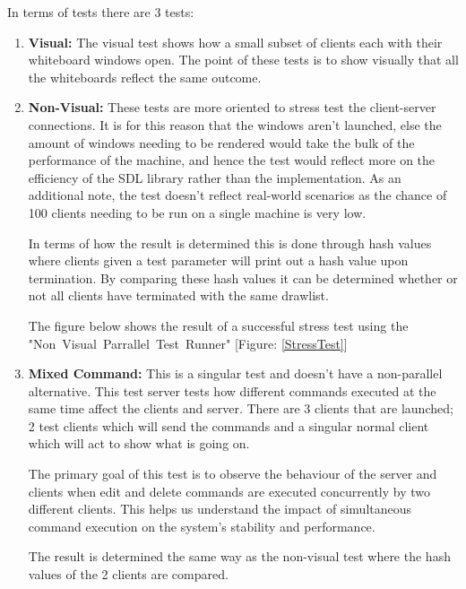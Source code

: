 \documentclass[12pt, a4paper]{report}
\begin{document}
In terms of tests there are 3 tests:
\begin{enumerate}
    \item \textbf{Visual:} The visual test shows how a small subset of clients each with their whiteboard windows open. The point of these tests is to show visually that all the whiteboards reflect the same outcome.
    
    \item \textbf{Non-Visual:} These tests are more oriented to stress test the client-server connections. It is for this reason that the windows aren't launched, else the amount of windows needing to be rendered would take the bulk of the performance of the machine, and hence the test would reflect more on the efficiency of the SDL library rather than the implementation. As an additional note, the test doesn't reflect real-world scenarios as the chance of 100 clients needing to be run on a single machine is very low.

    In terms of how the result is determined this is done through hash values where clients given a test parameter will print out a hash value upon termination. By comparing these hash values it can be determined whether or not all clients have terminated with the same drawlist.

    The figure below shows the result of a successful stress test using the "Non\ Visual\ Parrallel\ Test\ Runner" [Figure: \ref{StressTest}]
    
    \item \textbf{Mixed Command:} This is a singular test and doesn't have a non-parallel alternative. This test server tests how different commands executed at the same time affect the clients and server. There are 3 clients that are launched; 2 test clients which will send the commands and a singular normal client which will act to show what is going on. 
    
    The primary goal of this test is to observe the behaviour of the server and clients when edit and delete commands are executed concurrently by two different clients. This helps us understand the impact of simultaneous command execution on the system's stability and performance.

    The result is determined the same way as the non-visual test where the hash values of the 2 clients are compared.
\end{enumerate}
\end{document}

